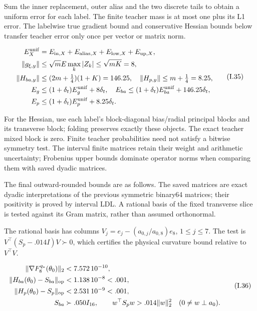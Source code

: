 \documentclass{article}
\begin{document}
Sum the inner replacement, outer alias and the two discrete tails to
obtain a uniform error for each label. The finite teacher mass is at
most one plus its L1 error. The labelwise true gradient bound and
conservative Hessian bounds below transfer teacher error only once per
vector or matrix norm.

\[
\begin{aligned}
E_X^{\rm unif}&=E_{{\rm in},X}+E_{{\rm alias},X}+E_{{\rm low},X}+E_{{\rm up},X},\\
\|g_{\xi,y}\|&\le\sqrt m E\max_k|Z_k|\le\sqrt{mK}=8,\\
\|H_{ba,y}\|&\le(2m+\tfrac14)(1+K)=146.25,\quad\|H_{p,y}\|\le m+\tfrac14=8.25,\\
E_g&\le(1+\delta_t)E_g^{\rm unif}+8\delta_t,\quad
E_{ba}\le(1+\delta_t)E_{ba}^{\rm unif}+146.25\delta_t,\\
E_p&\le(1+\delta_t)E_p^{\rm unif}+8.25\delta_t.
\end{aligned}
\tag{I.35}
\]

For the Hessian, use each label's block-diagonal bias/radial principal
blocks and its transverse block; folding preserves exactly these
objects. The exact teacher mixed block is zero. Finite teacher
probabilities need not satisfy a bitwise symmetry test. The interval
finite matrices retain their weight and arithmetic uncertainty;
Frobenius upper bounds dominate operator norms when comparing them with
saved dyadic matrices.

The final outward-rounded bounds are as follows. The saved matrices are
exact dyadic interpretations of the previous symmetric binary64
matrices; their positivity is proved by interval LDL. A rational basis
of the fixed transverse slice is tested against its Gram matrix, rather
than assumed orthonormal.

The rational basis has columns \(V_j=e_j-(a_{0,j}/a_{0,8})e_8\),
\(1\le j\le7\). The test is \(V^\top(S_p-.014I)V\succ0\), which
certifies the physical curvature bound relative to \(V^\top V\).

\[
\begin{aligned}
\|\nabla F_8^{q_*}(\theta_0)\|_2&<7.572\,10^{-10},\\
\|H_{ba}(\theta_0)-S_{ba}\|_{\rm op}&<1.138\,10^{-8}<.001,\\
\|H_p(\theta_0)-S_p\|_{\rm op}&<2.531\,10^{-9}<.001,\\
S_{ba}&\succ.050I_{16},\qquad
w^\top S_pw>.014\|w\|_2^2\quad(0\ne w\perp a_0).
\end{aligned}
\tag{I.36}
\]
\end{document}
